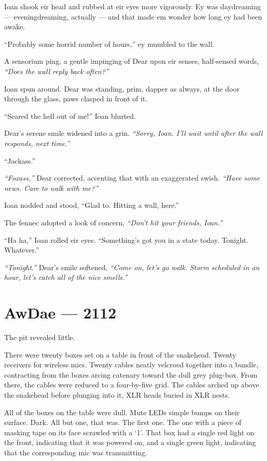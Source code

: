 Ioan shook eir head and rubbed at eir eyes more vigorously. Ey was daydreaming --- eveningdreaming, actually --- and that made em wonder how long ey had been awake.

``Probably some horrid number of hours,'' ey mumbled to the wall.

A sensorium ping, a gentle impinging of Dear upon eir senses, half-sensed words, \emph{``Does the wall reply back often?''}

Ioan spun around. Dear was standing, prim, dapper as always, at the door through the glass, paws clasped in front of it.

``Scared the hell out of me!'' Ioan blurted.

Dear's serene smile widened into a grin. \emph{``Sorry, Ioan. I'll wait until after the wall responds, next time.''}

``Jackass.''

\emph{``Foxass,''} Dear corrected, accenting that with an exaggerated swish. \emph{``Have some news. Care to walk with me?''}

Ioan nodded and stood, ``Glad to. Hitting a wall, here.''

The fennec adopted a look of concern, \emph{``Don't hit your friends, Ioan.''}

``Ha ha,'' Ioan rolled eir eyes. ``Something's got you in a state today. Tonight. Whatever.''

\emph{``Tonight.''} Dear's smile softened, \emph{``Come on, let's go walk. Storm scheduled in an hour, let's catch all of the nice smells.''}

\chapter*{AwDae — 2112}

The pit revealed little.

There were twenty boxes set on a table in front of the snakehead. Twenty receivers for wireless mics. Twenty cables neatly velcroed together into a bundle, contracting from the boxes arcing catenary toward the dull grey plug-box. From there, the cables were reduced to a four-by-five grid. The cables arched up above the snakehead before plunging into it, XLR heads buried in XLR nests.

All of the boxes on the table were dull. Mute LEDs simple bumps on their surface. Dark. All but one, that was. The first one. The one with a piece of masking tape on its face scrawled with a `1'. That box had a single red light on the front, indicating that it was powered on, and a single green light, indicating that the corresponding mic was transmitting.

